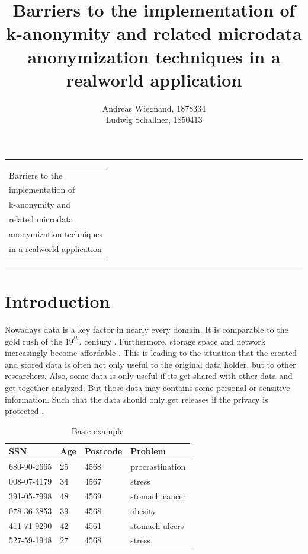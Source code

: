 \documentclass{llncs}
\begin{document}
\thispagestyle{empty}
\rule{\textwidth}{1pt}
\vspace{2pt}
\begin{flushright}
\Huge
\begin{tabular}{@{}l}
Barriers to the\\
implementation of\\
k-anonymity and\\
related microdata\\
anonymization techniques\\
in a realworld application\\[6pt]

\end{tabular}
\end{flushright}
\rule{\textwidth}{1pt}
\vfill
\title{Barriers to the implementation of k-anonymity and related microdata anonymization techniques in a realworld application}
\author{Andreas Wiegnand, 1878334\\
	Ludwig Schallner, 1850413}
\institute{}
\maketitle
%
\newpage
\setcounter{page}{1}
\section{Introduction}
%
Nowadays data is a key factor in nearly every domain. It is comparable to the gold rush of the \ensuremath{19^{th}.} century \cite{datarevo}. Furthermore, storage space and network increasingly become affordable \cite{sweeney2002k}. 
This is leading to the situation that the created and stored data is often not only useful to the original data holder, but to other researchers. Also, some data is only useful if its get shared with other data and get together analyzed. But those data may contains some personal or sensitive information. Such that the data should only get releases if the privacy is protected \cite{li2006achieving}.\\

\begin{table}[]
	\centering
	\caption{Basic example}
	\label{intro_example}
	\begin{tabular}{@{}llll@{}}
		\toprule
		SSN         & Age & Postcode & Problem         \\ \midrule
		680-90-2665 & 25  & 4568     & procrastination \\
		008-07-4179 & 34  & 4567     & stress          \\
		391-05-7998 & 48  & 4569     & stomach cancer  \\
		078-36-3853 & 39  & 4568     & obesity         \\
		411-71-9290 & 42  & 4561     & stomach ulcers  \\
		527-59-1948 & 27  & 4568     & stress          \\ \bottomrule
	\end{tabular}
\end{table}
\end{document}
